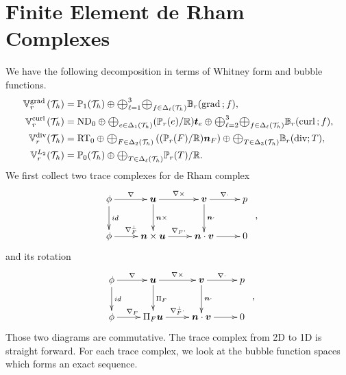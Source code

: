 \documentclass[10pt]{amsart}
\newcommand{\Oplus}{\ensuremath{\vcenter{\hbox{\scalebox{1.5}{$\oplus$}}}}}
\begin{document}
\section{Finite Element de Rham Complexes}
We have the following decomposition in terms of Whitney form and  bubble functions.
\begin{align*}
\mathbb V^{\grad}_r(\mathcal T_h) &= \mathbb P_1(\mathcal T_h) \oplus \Oplus_{\ell = 1}^3\Oplus_{f\in \Delta_{\ell}(\mathcal T_h)} \mathbb B_{r}(\grad; f),\\
\mathbb V^{\curl}_r(\mathcal T_h) &= {\rm ND}_0 \oplus \Oplus_{e\in \Delta_1(\mathcal T_h)}(\mathbb P_r(e)/\mathbb R) \bs t_e \oplus \Oplus_{\ell = 2}^3\Oplus_{f\in \Delta_{\ell}(\mathcal T_h)} \mathbb B_{r}(\curl; f),\\
\mathbb V^{\div}_r(\mathcal T_h) &= {\rm RT}_0\oplus \Oplus_{F\in \Delta_2(\mathcal T_h)}\left((\mathbb P_{r}(F)/\mathbb R)\bs n_F\right) \oplus \Oplus_{T\in \Delta_{3}(\mathcal T_h)} \mathbb B_{r}(\div; T),\\
\mathbb V^{L_2}_r(\mathcal T_h) &= \mathbb P_0(\mathcal T_h) \oplus \Oplus_{T\in \Delta_{\ell}(\mathcal T_h)} \mathbb P_r(T)/\mathbb R.
\end{align*}
We first collect two trace complexes for de Rham complex
\begin{equation}\label{eq:tracecomplex1}
\begin{array}{c}
\xymatrix{
   \phi \ar[d]^{id} \ar[r]^-{\nabla}
& \bs u \ar[d]^{\bs n \times}   \ar[r]^-{\nabla \times} 
& \bs v \ar[d]^{\bs n\cdot} \ar[r]^{\nabla\cdot} 
& p \\
 \phi \ar[r]^{\nabla_F^{\bot}}
& \bs n \times \bs u   \ar[r]^{\nabla_F\cdot} 
& \bs n\cdot \bs v \ar[r]^{}& 0    }
\end{array},
\end{equation}
and its rotation
\begin{equation}\label{eq:tracecomplex1}
\begin{array}{c}
\xymatrix{
   \phi \ar[d]^{id} \ar[r]^-{\nabla}
& \bs u \ar[d]^{\Pi_F}   \ar[r]^-{\nabla \times} 
& \bs v \ar[d]^{\bs n\cdot} \ar[r]^{\nabla\cdot} 
& p \\
 \phi \ar[r]^{\nabla_F}
& \Pi_F \bs u   \ar[r]^{\nabla_F^{\bot}\cdot} 
& \bs n\cdot \bs v \ar[r]^{}& 0    }
\end{array},
\end{equation}
Those two diagrams are commutative. The trace complex from 2D to 1D is straight forward. For each trace complex, we look at the bubble function spaces which forms an exact sequence. 
\end{document}
